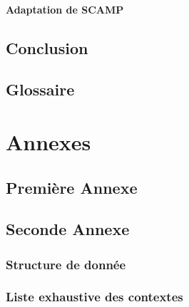 \documentclass{tnreport}
\begin{document}
\subsection{Adaptation de SCAMP}

\chapter{Conclusion}

\cleardoublepage

\renewcommand{\tocbibname}{Bibliographie / Webographie}

\nocite{*}


\cleardoublepage

\listoffigures
\cleardoublepage

\listoftables
\cleardoublepage

\chapter*{Glossaire}

\cleardoublepage
\renewcommand{\thesubsection}{\Roman{subsection}}

\appendix
\part*{Annexes}
\cleardoublepage

\chapter{Première Annexe}


\cleardoublepage

\chapter{Seconde Annexe}

\section{Structure de donnée} %
\label{sec:strcuture_de_donn_e}


\section{Liste exhaustive des contextes}
\label{sec:context}
\end{document}
